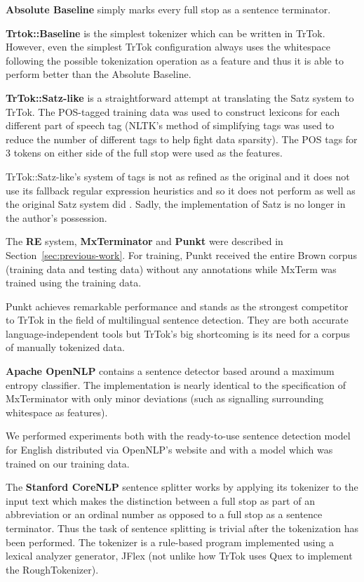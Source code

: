 \textbf{Absolute Baseline} simply marks every full stop as a sentence
terminator.

\textbf{Trtok::Baseline} is the simplest tokenizer which can be
written in TrTok. However, even the simplest TrTok configuration
always uses the whitespace following the possible tokenization
operation as a feature and thus it is able to perform better than the
Absolute Baseline.

\textbf{TrTok::Satz-like} is a straightforward attempt at translating
the Satz system to TrTok. The POS-tagged training data was used to
construct lexicons for each different part of speech tag (NLTK's
method of simplifying tags was used to reduce the number of different
tags to help fight data sparsity). The POS tags for 3 tokens on either
side of the full stop were used as the features.

TrTok::Satz-like's system of tags is not as refined as the original
and it does not use its fallback regular expression heuristics and so
it does not perform as well as the original Satz system did
\cite{sbd-satz}. Sadly, the implementation of Satz is no longer in the
author's possession.

The \textbf{RE} system, \textbf{MxTerminator} and \textbf{Punkt} were
described in Section~\ref{sec:previous-work}. For training, Punkt
received the entire Brown corpus (training data and testing data)
without any annotations while MxTerm was trained using the training
data.

Punkt achieves remarkable performance and stands as the strongest
competitor to TrTok in the field of multilingual sentence detection.
They are both accurate language-independent tools but TrTok's big
shortcoming is its need for a corpus of manually tokenized data.

\textbf{Apache OpenNLP} contains a sentence detector based around a
maximum entropy classifier. The implementation is nearly identical to
the specification of MxTerminator with only minor deviations (such as
signalling surrounding whitespace as features).

We performed experiments both with the ready-to-use sentence detection
model for English distributed via OpenNLP's website and with a model
which was trained on our training data.

The \textbf{Stanford CoreNLP} sentence splitter works by applying its
tokenizer to the input text which makes the distinction between a full
stop as part of an abbreviation or an ordinal number as opposed to a
full stop as a sentence terminator. Thus the task of sentence
splitting is trivial after the tokenization has been performed. The
tokenizer is a rule-based program implemented using a lexical analyzer
generator, JFlex (not unlike how TrTok uses Quex to implement the
RoughTokenizer).

